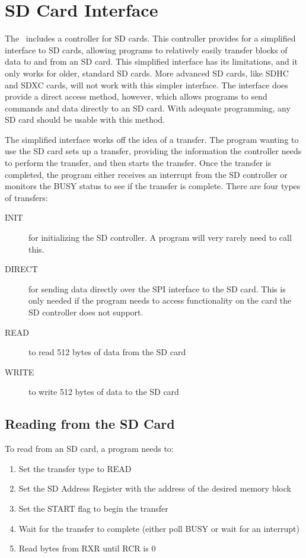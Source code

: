 \chapter{SD Card Interface}

The \jr\ includes a controller for SD cards. This controller provides for a simplified interface to SD cards, allowing programs to relatively easily transfer blocks of data to and from an SD card. This simplified interface has its limitations, and it only works for older, standard SD cards. More advanced SD cards, like SDHC and SDXC cards, will not work with this simpler interface. The interface does provide a direct access method, however, which allows programs to send commands and data directly to an SD card. With adequate programming, any SD card should be usable with this method.

The simplified interface works off the idea of a transfer. The program wanting to use the SD card sets up a transfer, providing the information the controller needs to perform the transfer, and then starts the transfer. Once the transfer is completed, the program either receives an interrupt from the SD controller or monitors the BUSY status to see if the transfer is complete. There are four types of transfers:

\begin{description}
    \item[INIT] for initializing the SD controller. A program will very rarely need to call this.

    \item[DIRECT] for sending data directly over the SPI interface to the SD card. This is only needed if the program needs to access functionality on the card the SD controller does not support.

    \item[READ] to read 512 bytes of data from the SD card

    \item[WRITE] to write 512 bytes of data to the SD card
\end{description}

\section{Reading from the SD Card}
To read from an SD card, a program needs to:
\begin{enumerate}
    \item Set the transfer type to READ
    \item Set the SD Address Register with the address of the desired memory block
    \item Set the START flag to begin the transfer
    \item Wait for the transfer to complete (either poll BUSY or wait for an interrupt)
    \item Read bytes from RXR until RCR is 0
\end{enumerate}

